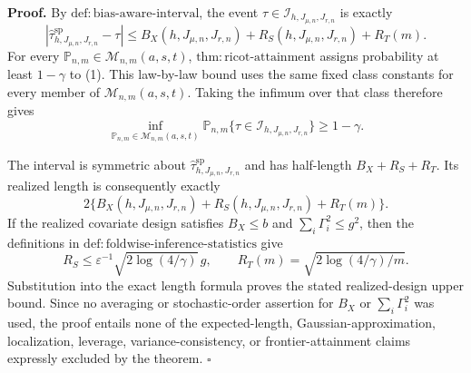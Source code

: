 \textbf{Proof.}
By \(\mathrm{def:bias\text{-}aware\text{-}interval}\), the event \(\tau\in\mathcal I_{h,J_{\mu,n},J_{r,n}}\) is exactly
\[
\left|\widehat\tau^{\mathrm{sp}}_{h,J_{\mu,n},J_{r,n}}-\tau\right|
\le B_X(h,J_{\mu,n},J_{r,n})+R_S(h,J_{\mu,n},J_{r,n})+R_T(m).
\tag{1}
\]
For every \(\mathbb P_{n,m}\in\mathcal M_{n,m}(a,s,t)\), \(\mathrm{thm:ricot\text{-}attainment}\) assigns probability at least \(1-\gamma\) to (1).  This law-by-law bound uses the same fixed class constants for every member of \(\mathcal M_{n,m}(a,s,t)\).  Taking the infimum over that class therefore gives
\[
\inf_{\mathbb P_{n,m}\in\mathcal M_{n,m}(a,s,t)}
\mathbb P_{n,m}\{\tau\in\mathcal I_{h,J_{\mu,n},J_{r,n}}\}
\ge1-\gamma.
\]

The interval is symmetric about \(\widehat\tau^{\mathrm{sp}}_{h,J_{\mu,n},J_{r,n}}\) and has half-length \(B_X+R_S+R_T\).  Its realized length is consequently exactly
\[
2\{B_X(h,J_{\mu,n},J_{r,n})+R_S(h,J_{\mu,n},J_{r,n})+R_T(m)\}.
\]
If the realized covariate design satisfies \(B_X\le b\) and \(\sum_i\Gamma_i^2\le g^2\), then the definitions in \(\mathrm{def:foldwise\text{-}inference\text{-}statistics}\) give
\[
R_S\le\varepsilon^{-1}\sqrt{2\log(4/\gamma)}\,g,
\qquad
R_T(m)=\sqrt{2\log(4/\gamma)/m}.
\]
Substitution into the exact length formula proves the stated realized-design upper bound.  Since no averaging or stochastic-order assertion for \(B_X\) or \(\sum_i\Gamma_i^2\) was used, the proof entails none of the expected-length, Gaussian-approximation, localization, leverage, variance-consistency, or frontier-attainment claims expressly excluded by the theorem. \(\square\)